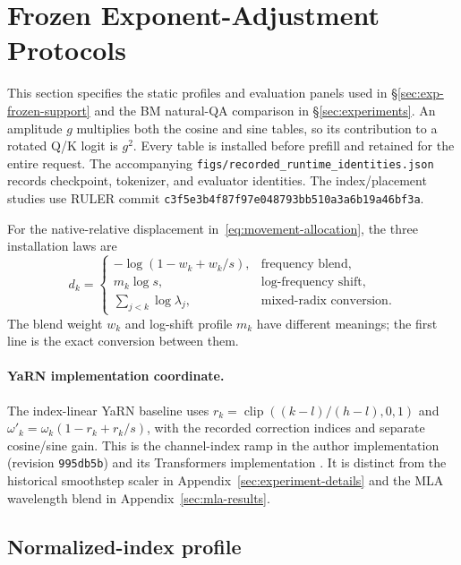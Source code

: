 \section{Frozen Exponent-Adjustment Protocols}
\label{sec:adjustment-details}

This section specifies the static profiles and evaluation panels used in
\S\ref{sec:exp-frozen-support} and the BM natural-QA comparison in \S\ref{sec:experiments}. An amplitude $g$ multiplies both the cosine
and sine tables, so its contribution to a rotated Q/K logit is $g^2$.
Every table is installed before prefill and retained for the entire request.
The accompanying \texttt{figs/recorded\_runtime\_identities.json} records
checkpoint, tokenizer, and evaluator identities. The index/placement studies
use RULER commit \texttt{c3f5e3b4f87f97e048793bb510a3a6b19a46bf3a}.

\FloatBarrier
For the native-relative displacement in~\eqref{eq:movement-allocation}, the three installation laws are
\begin{equation}
d_k=\begin{cases}
-\log(1-w_k+w_k/s),&\text{frequency blend},\\
m_k\log s,&\text{log-frequency shift},\\
\sum_{j<k}\log\lambda_j,&\text{mixed-radix conversion}.
\end{cases}
\label{eq:adjustment-families}
\end{equation}
The blend weight $w_k$ and log-shift profile $m_k$ have different meanings; the first line is the exact conversion between them.

\paragraph{YaRN implementation coordinate.}
The index-linear YaRN baseline uses
$r_k=\operatorname{clip}((k-l)/(h-l),0,1)$ and
$\omega'_k=\omega_k(1-r_k+r_k/s)$, with the recorded correction indices and separate cosine/sine gain. This is the channel-index ramp in the author implementation (revision \texttt{995db5b}) and its Transformers implementation \citep{peng2024yarn}. It is distinct from the historical smoothstep scaler in Appendix~\ref{sec:experiment-details} and the MLA wavelength blend in Appendix~\ref{sec:mla-results}.



\subsection{Normalized-index profile}
\label{sec:index-adjustment}

